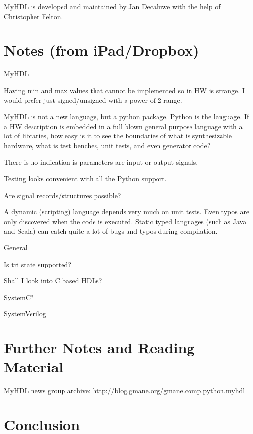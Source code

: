 \documentclass[10pt, conference, compsocconf]{IEEEtran}
\begin{document}
MyHDL is developed and maintained by Jan Decaluwe with the help of
Christopher Felton.  

\section{Notes (from iPad/Dropbox)}

MyHDL

Having min and max values that cannot be implemented so in HW is strange. I would prefer just signed/unsigned with a power of 2 range.

MyHDL is not a new language, but a python package. Python is the language. If a HW description is embedded in a full blown general purpose language with a lot of libraries, how easy is it to see the boundaries of what is synthesizable hardware, what is test benches, unit tests, and even generator code?

There is no indication is parameters are input or output signals.

Testing looks convenient with all the Python support.

Are signal records/structures possible?

A dynamic (scripting) language depends very much on unit tests. Even typos are only
discovered when the code is executed. Static typed languages (such as Java
and Scala) can catch quite a lot of bugs and typos during compilation.

General

Is tri state supported?

Shall I look into C based HDLs?

SystemC?

SystemVerilog

\section{Further Notes and Reading Material}

MyHDL news group archive: \url{http://blog.gmane.org/gmane.comp.python.myhdl}

\section{Conclusion}
\label{sec:conclusion}





\end{document}
